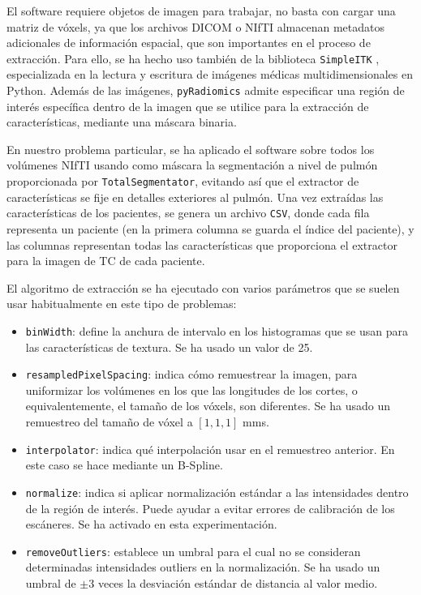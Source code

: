 El software requiere objetos de imagen para trabajar, no basta con cargar una matriz de vóxels, ya que los archivos DICOM o NIfTI almacenan metadatos adicionales de información espacial, que son importantes en el proceso de extracción. Para ello, se ha hecho uso también de la biblioteca \texttt{SimpleITK} \parencite{yaniv2018simpleitk}, especializada en la lectura y escritura de imágenes médicas multidimensionales en Python. Además de las imágenes, \texttt{pyRadiomics} admite especificar una región de interés específica dentro de la imagen que se utilice para la extracción de características, mediante una máscara binaria.

En nuestro problema particular, se ha aplicado el software sobre todos los volúmenes NIfTI usando como máscara la segmentación a nivel de pulmón proporcionada por \texttt{TotalSegmentator}, evitando así que el extractor de características se fije en detalles exteriores al pulmón. Una vez extraídas las características de los pacientes, se genera un archivo \texttt{CSV}, donde cada fila representa un paciente (en la primera columna se guarda el índice del paciente), y las columnas representan todas las características que proporciona el extractor para la imagen de TC de cada paciente.

El algoritmo de extracción se ha ejecutado con varios parámetros que se suelen usar habitualmente en este tipo de problemas:

\begin{itemize}
    \item \texttt{binWidth}: define la anchura de intervalo en los histogramas que se usan para las características de textura. Se ha usado un valor de 25.
    \item \texttt{resampledPixelSpacing}: indica cómo remuestrear la imagen, para uniformizar los volúmenes en los que las longitudes de los cortes, o equivalentemente, el tamaño de los vóxels, son diferentes. Se ha usado un remuestreo del tamaño de vóxel a $[1, 1, 1]$ mms.
    \item \texttt{interpolator}: indica qué interpolación usar en el remuestreo anterior. En este caso se hace mediante un B-Spline.
    \item \texttt{normalize}: indica si aplicar normalización estándar a las intensidades dentro de la región de interés. Puede ayudar a evitar errores de calibración de los escáneres. Se ha activado en esta experimentación.
    \item \texttt{removeOutliers}: establece un umbral para el cual no se consideran determinadas intensidades outliers en la normalización. Se ha usado un umbral de $\pm 3$ veces la desviación estándar de distancia al valor medio.
\end{itemize}

